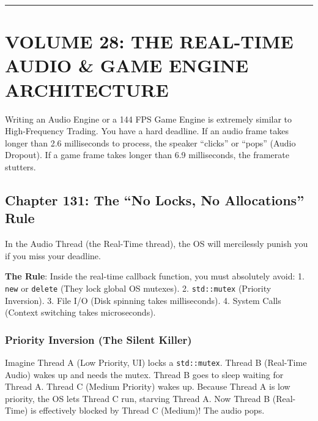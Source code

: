 \begin{center}\rule{0.5\linewidth}{0.5pt}\end{center}

\hypertarget{volume-28-the-real-time-audio-game-engine-architecture}{%
\section{VOLUME 28: THE REAL-TIME AUDIO \& GAME ENGINE
ARCHITECTURE}\label{volume-28-the-real-time-audio-game-engine-architecture}}

Writing an Audio Engine or a 144 FPS Game Engine is extremely similar to
High-Frequency Trading. You have a hard deadline. If an audio frame
takes longer than 2.6 milliseconds to process, the speaker ``clicks'' or
``pops'' (Audio Dropout). If a game frame takes longer than 6.9
milliseconds, the framerate stutters.

\hypertarget{chapter-131-the-no-locks-no-allocations-rule}{%
\subsection{Chapter 131: The ``No Locks, No Allocations''
Rule}\label{chapter-131-the-no-locks-no-allocations-rule}}

In the Audio Thread (the Real-Time thread), the OS will mercilessly
punish you if you miss your deadline.

\textbf{The Rule}: Inside the real-time callback function, you must
absolutely avoid: 1. \passthrough{\lstinline!new!} or
\passthrough{\lstinline!delete!} (They lock global OS mutexes). 2.
\passthrough{\lstinline!std::mutex!} (Priority Inversion). 3. File I/O
(Disk spinning takes milliseconds). 4. System Calls (Context switching
takes microseconds).

\hypertarget{priority-inversion-the-silent-killer}{%
\subsubsection{Priority Inversion (The Silent
Killer)}\label{priority-inversion-the-silent-killer}}

Imagine Thread A (Low Priority, UI) locks a
\passthrough{\lstinline!std::mutex!}. Thread B (Real-Time Audio) wakes
up and needs the mutex. Thread B goes to sleep waiting for Thread A.
Thread C (Medium Priority) wakes up. Because Thread A is low priority,
the OS lets Thread C run, starving Thread A. Now Thread B (Real-Time) is
effectively blocked by Thread C (Medium)! The audio pops.

